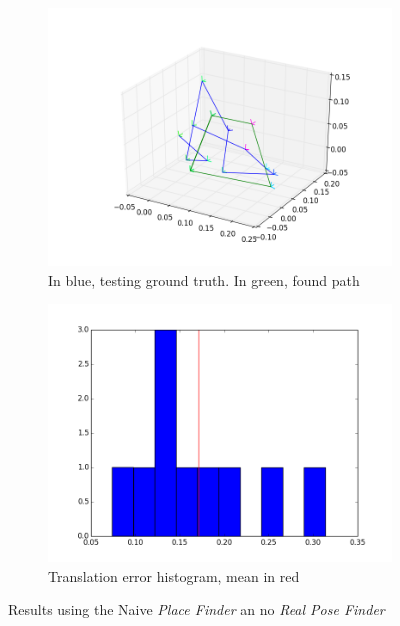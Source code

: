 \begin{figure}[htpb]
  \begin{subfigure}[b]{6cm}
          \includegraphics[width=\linewidth]{img/desktop_2_naive_empty_path_1.png}
          \caption{In blue, testing ground truth. In green, found path}                
          \label{fig:desktop_2_naive_empty_path_1}
  \end{subfigure}   
  \qquad
  \begin{subfigure}[b]{6cm}
         \includegraphics[width=\linewidth]{img/desktop_2_naive_empty_dist_1.png}
         \caption{Translation error histogram, mean in red}                
         \label{fig:desktop_2_naive_empty_dist_1}
  \end{subfigure}
  \caption{Results using the Naive \textit{Place Finder} an no \textit{Real Pose Finder}}
\end{figure}


